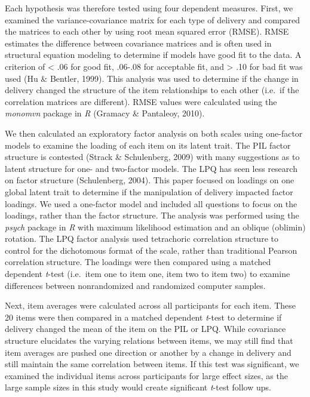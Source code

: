 \documentclass[english,man, mask]{apa6}
\theoremstyle{definition}
\theoremstyle{definition}
\theoremstyle{definition}
\theoremstyle{remark}
\begin{document}
Each hypothesis was therefore tested using four dependent measures.
First, we examined the variance-covariance matrix for each type of
delivery and compared the matrices to each other by using root mean
squared error (RMSE). RMSE estimates the difference between covariance
matrices and is often used in structural equation modeling to determine
if models have good fit to the data. A criterion of \textless{} .06 for
good fit, .06-.08 for acceptable fit, and \textgreater{} .10 for bad fit
was used (Hu \& Bentler, 1999). This analysis was used to determine if
the change in delivery changed the structure of the item relationships
to each other (i.e.~if the correlation matrices are different). RMSE
values were calculated using the \emph{monomvn} package in \emph{R}
(Gramacy \& Pantaleoy, 2010).

We then calculated an exploratory factor analysis on both scales using
one-factor models to examine the loading of each item on its latent
trait. The PIL factor structure is contested (Strack \& Schulenberg,
2009) with many suggestions as to latent structure for one- and
two-factor models. The LPQ has seen less research on factor structure
(Schulenberg, 2004). This paper focused on loadings on one global latent
trait to determine if the manipulation of delivery impacted factor
loadings. We used a one-factor model and included all questions to focus
on the loadings, rather than the factor structure. The analysis was
performed using the \emph{psych} package in \emph{R} with maximum
likelihood estimation and an oblique (oblimin) rotation. The LPQ factor
analysis used tetrachoric correlation structure to control for the
dichotomous format of the scale, rather than traditional Pearson
correlation structure. The loadings were then compared using a matched
dependent \emph{t}-test (i.e.~item one to item one, item two to item
two) to examine differences between nonrandomized and randomized
computer samples.

Next, item averages were calculated across all participants for each
item. These 20 items were then compared in a matched dependent
\emph{t}-test to determine if delivery changed the mean of the item on
the PIL or LPQ. While covariance structure elucidates the varying
relations between items, we may still find that item averages are pushed
one direction or another by a change in delivery and still maintain the
same correlation between items. If this test was significant, we
examined the individual items across participants for large effect
sizes, as the large sample sizes in this study would create significant
\emph{t}-test follow ups.
\end{document}
